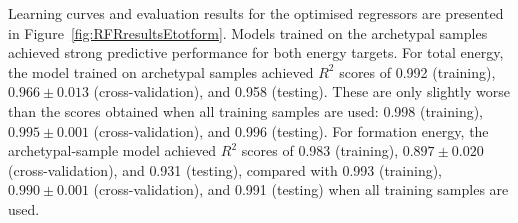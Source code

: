 \documentclass{WileyMSP-template}
\newcommand{\revision}[1]{{\color{red}#1}}
\begin{document}
Learning curves and evaluation results for the optimised regressors are presented in Figure~\ref{fig:RFRresultsEtotform}. Models trained on the archetypal samples achieved strong predictive performance for both energy targets. For total energy, the model trained on archetypal samples achieved $R^2$ scores of \revision{0.992} (training), \revision{$0.966 \pm 0.013$} (cross-validation), and \revision{0.958} (testing). These are \revision{only slightly worse than} the scores obtained when all training samples are used: 0.998 (training), $0.995 \pm 0.001$ (cross-validation), and \revision{0.996} (testing). For formation energy, the archetypal-sample model achieved $R^2$ scores of \revision{0.983} (training), \revision{$0.897 \pm 0.020$} (cross-validation), and \revision{0.931} (testing), compared with 0.993 (training), $0.990 \pm 0.001$ (cross-validation), and 0.991 (testing) when all training samples are used.
\end{document}

